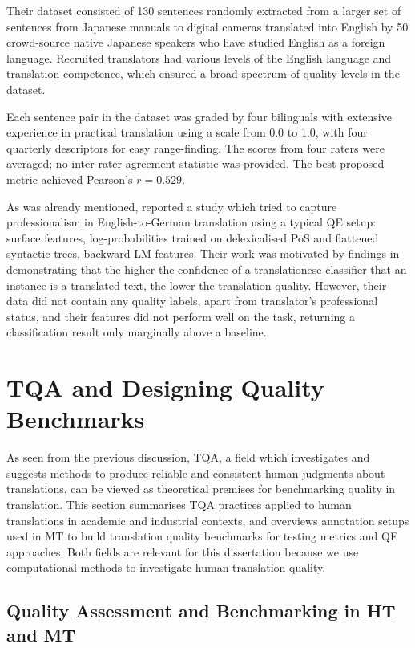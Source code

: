 Their dataset consisted of 130 sentences randomly extracted from a larger set of sentences from Japanese manuals to digital cameras translated into English by 50 crowd-source native Japanese speakers who have studied English as a foreign language. Recruited translators had various levels of the English language and translation competence, which ensured a broad spectrum of quality levels in the dataset. 

Each sentence pair in the dataset was graded by four bilinguals with extensive experience in practical translation using a scale from 0.0 to 1.0, with four quarterly descriptors for easy range-finding. The scores from four raters were averaged; no inter-rater agreement statistic was provided. The best proposed metric achieved Pearson's $r=0.529$.

As was already mentioned, \citet{Rubino2016} reported a study which tried to capture professionalism in English-to-German translation using a typical QE setup: surface features, log-probabilities trained on delexicalised PoS and flattened syntactic trees, backward LM features. Their work was motivated by findings in~\citet{Aharoni2014} demonstrating that the higher the confidence of a translationese classifier that an instance is a translated text, the lower the translation quality. However, their data did not contain any quality labels, apart from translator's professional status, and their features did not perform well on the task, returning a classification result only marginally above a baseline.


\section{\label{sec:ass}TQA and Designing Quality Benchmarks}

As seen from the previous discussion, TQA, a field which investigates and suggests methods to produce reliable and consistent human judgments about translations, can be viewed as theoretical premises for benchmarking quality in translation. 
This section summarises TQA practices applied to human translations in academic and industrial contexts, and overviews annotation setups used in MT to build translation quality benchmarks for testing metrics and QE approaches. Both fields are relevant for this dissertation because we use computational methods to investigate human translation quality. 

\subsection{\label{ssec:practices}Quality Assessment and Benchmarking in HT and MT}

